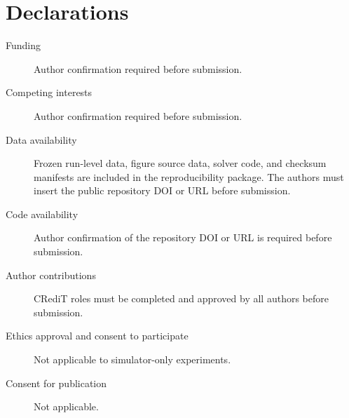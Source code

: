 \documentclass[pdflatex,sn-mathphys-num]{sn-jnl}
\begin{document}









\backmatter
\section*{Declarations}
\begin{description}
\item[Funding] Author confirmation required before submission.
\item[Competing interests] Author confirmation required before submission.
\item[Data availability] Frozen run-level data, figure source data, solver
code, and checksum manifests are included in the reproducibility package.
The authors must insert the public repository DOI or URL before submission.
\item[Code availability] Author confirmation of the repository DOI or URL is
required before submission.
\item[Author contributions] CRediT roles must be completed and approved by
all authors before submission.
\item[Ethics approval and consent to participate] Not applicable to
simulator-only experiments.
\item[Consent for publication] Not applicable.
\end{description}


\end{document}
